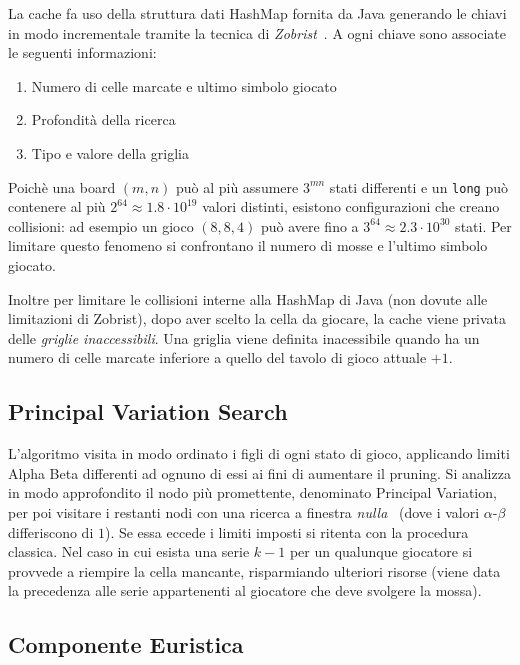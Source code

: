 \documentclass{article}
\begin{document}
La cache fa uso della struttura dati HashMap fornita da Java generando le chiavi 
in modo incrementale tramite la tecnica di \emph{Zobrist}~\cite{zobrist}. A ogni
chiave sono associate le seguenti informazioni:
\begin{enumerate}
  \item Numero di celle marcate e ultimo simbolo giocato
  \item Profondit\`a della ricerca
  \item Tipo e valore della griglia
\end{enumerate}
Poich\`e una board $(m,n)$ pu\`o al pi\`u assumere $3^{mn}$ stati differenti e
un \verb!long! pu\`o contenere al pi\`u $2^{64} \approx 1.8 \cdot 10^{19}$ valori distinti,
esistono configurazioni che creano collisioni: ad esempio un gioco $(8, 8, 4)$
pu\`o avere fino a $3^{64} \approx 2.3 \cdot 10^{30}$ stati. Per limitare questo
fenomeno si confrontano il numero di mosse e l'ultimo simbolo giocato.

Inoltre per limitare le collisioni interne alla HashMap di Java (non dovute alle
limitazioni di Zobrist), dopo aver scelto la cella da giocare, la cache viene
privata delle \emph{griglie inaccessibili}. Una griglia viene definita
inacessibile quando ha un numero di celle marcate inferiore a quello del tavolo
di gioco attuale $+ 1$.

\subsection*{Principal Variation Search}

L'algoritmo visita in modo ordinato i figli di ogni stato di gioco, applicando
limiti Alpha Beta differenti ad ognuno di essi ai fini di aumentare il pruning.
Si analizza in modo approfondito il nodo pi\`u promettente, denominato Principal
Variation, per poi visitare i restanti nodi con una ricerca a finestra \emph{nulla}~\cite{scout}
(dove i valori $\alpha$-$\beta$ differiscono di $1$). Se essa eccede i limiti
imposti si ritenta con la procedura classica.
Nel caso in cui esista una serie $k-1$ per un qualunque giocatore si provvede a
riempire la cella mancante, risparmiando ulteriori risorse (viene data la precedenza
alle serie appartenenti al giocatore che deve svolgere la mossa).

\subsection*{Componente Euristica}
\end{document}
